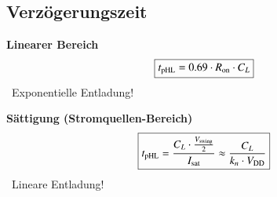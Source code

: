 \subsection{Verzögerungszeit}

\begin{minipage}[t]{0.48\columnwidth}
    \textbf{Linearer Bereich}
    $$ \boxed{t_{\rm pHL} = 0.69 \cdot R_{\rm on} \cdot C_L} $$
    \textrightarrow\ Exponentielle Entladung! 
\end{minipage}
\hfill
\begin{minipage}[t]{0.48\columnwidth}
    \textbf{Sättigung (Stromquellen-Bereich)}
    $$ \boxed{t_{\rm pHL} = \frac{C_L \cdot \frac{V_{\rm swing}}{2}}{I_{\rm sat}} \approx \frac{C_L}{k_n \cdot V_{\rm DD}} }$$
    \textrightarrow\ Lineare Entladung!
\end{minipage}


